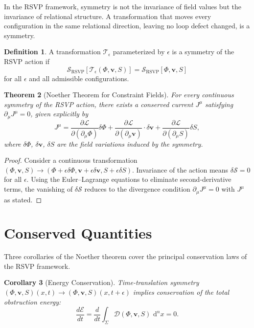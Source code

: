 \documentclass[12pt,a4paper,openany]{book}
\theoremstyle{plain}
\newtheorem{theorem}{Theorem}[chapter]
\newtheorem{corollary}[theorem]{Corollary}
\theoremstyle{definition}
\newtheorem{definition}[theorem]{Definition}
\theoremstyle{remark}
\newcommand{\dvol}{\,\mathrm{d}^n x}
\begin{document}
In the RSVP framework, symmetry is not the invariance of field values but the invariance of relational structure. A transformation that moves every configuration in the same relational direction, leaving no loop defect changed, is a symmetry.

\begin{definition}
A transformation $\mathcal{T}_\epsilon$ parameterized by $\epsilon$ is a symmetry of the RSVP action if
\[
\mathcal{S}_{\mathrm{RSVP}}[\mathcal{T}_\epsilon(\Phi,\mathbf{v},S)] = \mathcal{S}_{\mathrm{RSVP}}[\Phi,\mathbf{v},S]
\]
for all $\epsilon$ and all admissible configurations.
\end{definition}

\begin{theorem}[Noether Theorem for Constraint Fields]
\label{thm:noether}
For every continuous symmetry of the RSVP action, there exists a conserved current $J^\mu$ satisfying $\partial_\mu J^\mu = 0$, given explicitly by
\[
J^\mu = \frac{\partial\mathcal{L}}{\partial(\partial_\mu\Phi)}\delta\Phi + \frac{\partial\mathcal{L}}{\partial(\partial_\mu\mathbf{v})}\cdot\delta\mathbf{v} + \frac{\partial\mathcal{L}}{\partial(\partial_\mu S)}\delta S,
\]
where $\delta\Phi$, $\delta\mathbf{v}$, $\delta S$ are the field variations induced by the symmetry.
\end{theorem}

\begin{proof}
Consider a continuous transformation $(\Phi,\mathbf{v},S) \to (\Phi + \epsilon\delta\Phi, \mathbf{v} + \epsilon\delta\mathbf{v}, S + \epsilon\delta S)$. Invariance of the action means $\delta\mathcal{S} = 0$ for all $\epsilon$. Using the Euler--Lagrange equations to eliminate second-derivative terms, the vanishing of $\delta\mathcal{S}$ reduces to the divergence condition $\partial_\mu J^\mu = 0$ with $J^\mu$ as stated.
\end{proof}

\section{Conserved Quantities}

Three corollaries of the Noether theorem cover the principal conservation laws of the RSVP framework.

\begin{corollary}[Energy Conservation]
Time-translation symmetry $(\Phi,\mathbf{v},S)(x,t) \to (\Phi,\mathbf{v},S)(x,t+\epsilon)$ implies conservation of the total obstruction energy:
\[
\frac{d\mathcal{E}}{dt} = \frac{d}{dt}\int_\Sigma \mathcal{D}(\Phi,\mathbf{v},S)\,\dvol = 0.
\]
\end{corollary}
\end{document}
